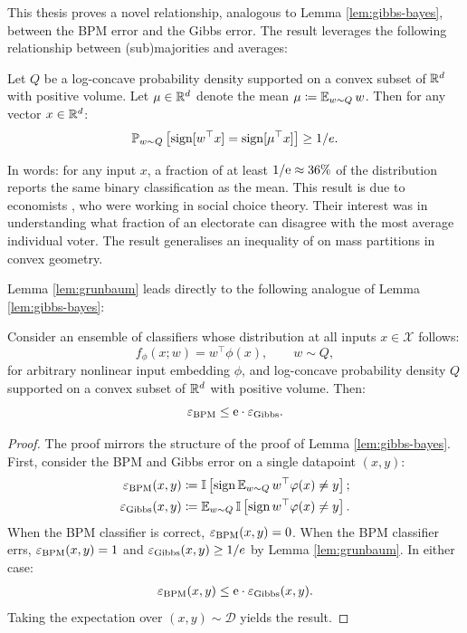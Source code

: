 \begin{refsection}
This thesis proves a novel relationship, analogous to Lemma \ref{lem:gibbs-bayes}, between the BPM error and the Gibbs error. The result leverages the following relationship between (sub)majorities and averages:

\begin{lemma}\label{lem:grunbaum}
Let $Q$ be a log-concave probability density supported on a convex subset of $\mathbb{R}^d$ with positive volume. Let $\mu\in\mathbb{R}^d$ denote the mean $\mu\coloneqq \operatorname{\mathbb{E}}_{w\sim Q}w$. Then for any vector $x\in\mathbb{R}^d$:
\begin{equation*}
\mathbb{P}_{w\sim Q} \left[\operatorname{sign} [w^\top x] = \operatorname{sign} [\mu^\top x]\right] \geq 1/e.
\end{equation*}
\end{lemma}
In words: for any input $x$, a fraction of at least $1/\mathrm{e}\approx36\%$ of the distribution reports the same binary classification as the mean. This result is due to economists \citet{meanvoter}, who were working in social choice theory. Their interest was in understanding what fraction of an electorate can disagree with the most average individual voter. The result generalises an inequality of \citet{grunbaum} on mass partitions in convex geometry.

Lemma \ref{lem:grunbaum} leads directly to the following analogue of Lemma \ref{lem:gibbs-bayes}:
\begin{lemma}\label{lem:gibbs-bpm} Consider an ensemble of classifiers whose distribution at all inputs $x\in\mathcal{X}$ follows:
\begin{equation*}
    f_\phi(x;w) = w^\top \phi(x), \qquad w\sim Q,
\end{equation*}
for arbitrary nonlinear input embedding $\phi$, and log-concave probability density $Q$ supported on a convex subset of $\mathbb{R}^d$ with positive volume. Then:
\begin{equation*}
    \varepsilon_{\mathrm{BPM}} \leq \mathrm{e} \cdot \varepsilon_{\mathrm{Gibbs}}.
\end{equation*}
\end{lemma}
\begin{proof} The proof mirrors the structure of the proof of Lemma \ref{lem:gibbs-bayes}. First, consider the BPM and Gibbs error on a single datapoint $(x,y)$:
    \begin{align*}
    \varepsilon_{\mathrm{BPM}}(x,y) &\coloneqq \mathbb{I}\left[\operatorname{sign} \operatorname{\mathbb{E}}_{w\sim Q}w^\top \varphi(x)\neq y\right]; \\
    \varepsilon_{\mathrm{Gibbs}}(x,y)&\coloneqq\operatorname{\mathbb{E}}_{w\sim Q} \mathbb{I}\left[\operatorname{sign} w^\top \varphi(x)\neq y\right].
    \end{align*}
    When the BPM classifier is correct, $\varepsilon_{\mathrm{BPM}}(x,y)=0$. When the BPM classifier errs, $\varepsilon_{\mathrm{BPM}}(x,y)=1$ and $\varepsilon_{\mathrm{Gibbs}}(x,y) \geq 1/e$ by Lemma \ref{lem:grunbaum}. In either case:
    \begin{align*}
        \varepsilon_{\mathrm{BPM}}(x,y)\leq \mathrm{e}\cdot \varepsilon_{\mathrm{Gibbs}}(x,y).
    \end{align*}
    Taking the expectation over $(x,y)\sim\mathcal{D}$ yields the result.
\end{proof}


\end{refsection}
